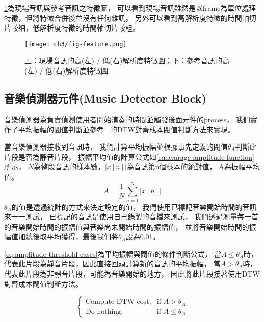 \documentclass[class=NCU_thesis, crop=false]{standalone}
\begin{document}
\cref{fig:fig-ch3-feature}為現場音訊與參考音訊之特徵圖，
可以看到現場音訊雖然是以frame為單位處理特徵，但將特徵合併後並沒有任何雜訊，
另外可以看到高解析度特徵的時間軸切片較細，低解析度特徵的時間軸切片較粗。

\begin{figure}[!hbt]
    \centering
    \texttt{[image: ch3/fig-feature.png]}
    \caption{上：現場音訊的高(左) / 低(右)解析度特徵圖；下：參考音訊的高(左) / 低(右)解析度特徵圖}
    \label{fig:fig-ch3-feature}
\end{figure}

\subsection{音樂偵測器元件(Music Detector Block)} \label{ch3-subst-music-detector}
音樂偵測器為負責偵測使用者開始演奏的時間並觸發後面元件的process，
我們實作了平均振幅的閥值判斷並參考~\cite{Lin2020AHumanComputerDuetSystem}
的DTW對齊成本閥值判斷方法來實現。

當音樂偵測器接收到音訊時，
我們計算平均振幅並根據事先定義的閥值$\theta _{A}$判斷此片段是否為靜音片段，
振幅平均值的計算公式如\cref{eq:avarage-amplitude-function}所示，
$N$為整段音訊的樣本數，$| x[n] \vert$為音訊第n個樣本的絕對值，
A為振幅平均值。
\begin{equation}
    \label{eq:avarage-amplitude-function}
    A = \frac{1}{N} \sum _{n=1}^{N} | x[n] \vert 
\end{equation}
$\theta _{A}$的值是透過統計的方式來決定設定的值，
我們使用已標記音樂開始時間的音訊來一一測試，
已標記的音訊是使用自己錄製的音檔來測試，
我們透過測量每一首的音樂開始時間的振幅值與音樂尚未開始時間的振幅值，
並將音樂開始時間的振幅值加總後取平均獲得，最後我們將$\theta _{A}$設為0.01。

\cref{eq:amplitude-threshold-cases}為平均振幅與閥值的條件判斷公式，
當$A \leq \theta _{A}$時，代表此片段為靜音片段，因此直接回頭計算新的音訊的平均振幅，
當$A > \theta _{A}$時，代表此片段為非靜音片段，可能為音樂開始的地方，
因此將此片段接著使用DTW對齊成本閥值判斷方法。

\begin{equation} 
    \label{eq:amplitude-threshold-cases}
    \begin{cases}
        \text{Compute DTW cost}, & \text{if $A > \theta _{A}$} \\
        \text{Do nothing},  & \text{if $A \leq \theta _{A}$}
    \end{cases}
\end{equation}
\end{document}
